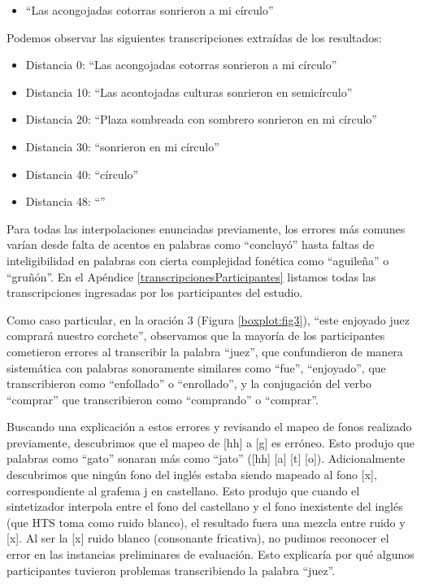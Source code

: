 \begin{itemize}
	\item ``Las acongojadas cotorras sonrieron a mi círculo''
\end{itemize}

Podemos observar las siguientes transcripciones extraídas de los resultados:

\begin{itemize}
	\item Distancia 0: ``Las acongojadas cotorras sonrieron a mi círculo''
	\item Distancia 10: ``Las acontojadas culturas sonrieron en semicírculo''
	\item Distancia 20: ``Plaza sombreada con sombrero sonrieron en mi círculo''
	\item Distancia 30: ``sonrieron en mi círculo''
	\item Distancia 40: ``círculo''
	\item Distancia 48: ``''
\end{itemize}

Para todas las interpolaciones enunciadas previamente, los errores más comunes varían desde falta de acentos en palabras como ``concluyó'' hasta faltas de inteligibilidad en palabras con cierta complejidad fonética como ``aguileña'' o ``gruñón''. En el Apéndice \ref{transcripcionesParticipantes} listamos todas las transcripciones ingresadas por los participantes del estudio.

Como caso particular, en la oración $3$ (Figura \ref{boxplot:fig3}), ``este enjoyado juez comprará nuestro corchete'', observamos que la mayoría de los participantes cometieron errores al transcribir la palabra ``juez'', que confundieron de manera sistemática con palabras sonoramente similares como ``fue'', ``enjoyado'', que transcribieron como ``enfollado'' o ``enrollado'', y la conjugación del verbo ``comprar'' que transcribieron como ``comprando'' o ``comprar''.

Buscando una explicación a estos errores y revisando el mapeo de fonos realizado previamente, descubrimos que el mapeo de [hh] a [g] es erróneo. Esto produjo que palabras como ``gato'' sonaran más como ``jato'' ([hh] [a] [t] [o]). Adicionalmente descubrimos que ningún fono del inglés estaba siendo mapeado al fono [x], correspondiente al grafema j en castellano. Esto produjo que cuando el sintetizador interpola entre el fono del castellano y el fono inexistente del inglés (que HTS toma como ruido blanco), el resultado fuera una mezcla entre ruido y [x]. Al ser la [x] ruido blanco (consonante fricativa), no pudimos reconocer el error en las instancias preliminares de evaluación. Esto explicaría por qué algunos participantes tuvieron problemas transcribiendo la palabra ``juez''.

